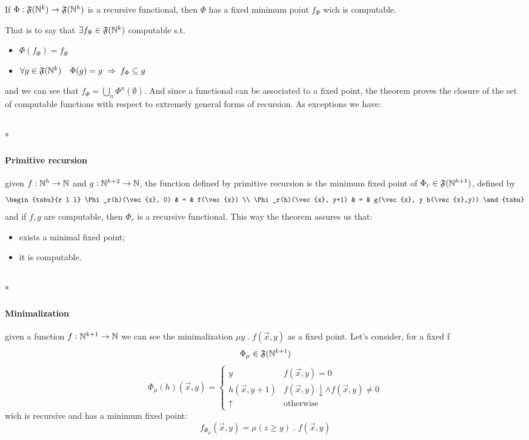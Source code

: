 \begin{theorem}\label{th:first-recursion}
  If $\Phi : \mathfrak{F}(\mathbb{N}^k) \rightarrow \mathfrak{F}(\mathbb{N}^h)$ is
  a recursive functional, then $\Phi$ has a fixed minimum point
  $f_\Phi$ wich is computable.
\end{theorem}

That is to say that $\exists f_\Phi \in \mathfrak{F}(\mathbb{N}^k)$
computable s.t.
\begin{itemize}
\item $\Phi(f_\Phi) = f_\Phi$
\item
  $\forall g \in \mathfrak{F}(\mathbb{N}^k) \quad \Phi(g) = g \; \Rightarrow
  \; f_\Phi \subseteq g$
\end{itemize}
and we can see that $f_\Phi = \bigcup\limits_n
\Phi^{n}(\emptyset)$. And since a functional can be associated to a
fixed point, the theorem proves the closure of the set of computable
functions with respect to extremely general forms of recursion. As
exceptions we have:

\mbox{}\\*
\paragraph{\textbf{Primitive recursion}}
given $f : \mathbb{N}^h \rightarrow \mathbb{N}$ and
$g : \mathbb{N}^{h+2} \rightarrow \mathbb{N}$, the function defined by primitive
recursion is the minimum fixed point of
$\Phi_r \in \mathfrak{F}(\mathbb{N}^{h+1})$, defined by
\[
  \begin{tabu}{r l l}
    \Phi_r(h)(\vec{x}, 0) & = & f(\vec{x}) \\
    \Phi_r(h)(\vec{x}, y+1) & = & g(\vec{x}, y h(\vec{x},y))
  \end{tabu}
\]
and if $f,g$ are computable, then $\Phi_r$ is a recursive
functional. This way the theorem assures us that:
\begin{itemize}
\item exists a minimal fixed point;
\item it is computable.
\end{itemize}

\mbox{}\\*
\paragraph{\textbf{Minimalization}}
given a function $f: \mathbb{N}^{k+1} \rightarrow \mathbb{N}$ we can see the
minimalization $\mu y \; . \; f(\vec{x}, y)$ as a fixed point. Let's
consider, for a fixed f
\[
  \Phi_\mu \in \mathfrak{F}(\mathbb{N}^{k+1})
\]
\[
  \Phi_\mu(h)(\vec{x}, y) = \begin{cases}
    y & f(\vec{x},y) = 0 \\
    h(\vec{x}, y+1) & f(\vec{x}, y)\downarrow \land f(\vec{x}, y) \neq 0 \\
    \uparrow & \mbox{otherwise}
  \end{cases}
\]
wich is recursive and has a minimum fixed point:
\[
  f_{\Phi_\mu}(\vec{x}, y) = \mu (z \geq y) \; . \; f(\vec{x}, y)
\]

